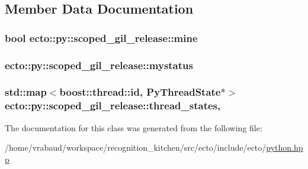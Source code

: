 \subsection{Member Data Documentation}
\hypertarget{classecto_1_1py_1_1scoped__gil__release_a9e9fbf0c5819ac1b706437d99a6459a3}{
\subsubsection[{mine}]{\setlength{\rightskip}{0pt plus 5cm}bool ecto\-::py\-::scoped\-\_\-gil\-\_\-release\-::mine\hspace{0.3cm}{\ttfamily [private]}}}\label{classecto_1_1py_1_1scoped__gil__release_a9e9fbf0c5819ac1b706437d99a6459a3}
\hypertarget{classecto_1_1py_1_1scoped__gil__release_a888a6813c86b9bbd2d5cd0d4a0f7e2f2}{
\subsubsection[{mystatus}]{ ecto\-::py\-::scoped\-\_\-gil\-\_\-release\-::mystatus\hspace{0.3cm}{\ttfamily [private]}}}\label{classecto_1_1py_1_1scoped__gil__release_a888a6813c86b9bbd2d5cd0d4a0f7e2f2}
\hypertarget{classecto_1_1py_1_1scoped__gil__release_a5ecad50e9899f01f3779ac22009af5a4}{
\subsubsection[{thread\-\_\-states}]{\setlength{\rightskip}{0pt plus 5cm}std\-::map$<$boost\-::thread\-::id, Py\-Thread\-State$\ast$$>$ ecto\-::py\-::scoped\-\_\-gil\-\_\-release\-::thread\-\_\-states\hspace{0.3cm}{\ttfamily [static]}, {\ttfamily [private]}}}\label{classecto_1_1py_1_1scoped__gil__release_a5ecad50e9899f01f3779ac22009af5a4}


The documentation for this class was generated from the following file\-:\begin{DoxyCompactItemize}
\item 
/home/vrabaud/workspace/recognition\-\_\-kitchen/src/ecto/include/ecto/\hyperlink{python_8hpp}{python.\-hpp}\end{DoxyCompactItemize}
